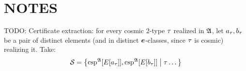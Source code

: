 \section{NOTES}
TODO: Certificate extraction: for every cosmic $2$-type $\tau$ realized in
$\mathfrak{A}$, let $a_\tau, b_\tau$ be a pair of distinct elements (and in
distinct $\bm{e}$-classes, since $\tau$ is cosmic) realizing it. Take:
\[
  \mathcal{S} = \left\{\operatorname{csp}^{\mathfrak{A}}[E[a_\tau]], \operatorname{csp}^{\mathfrak{A}}[E[b_\tau]]\mathrel{}\middle|\mathrel{}\tau
  \dots\right\}
\]